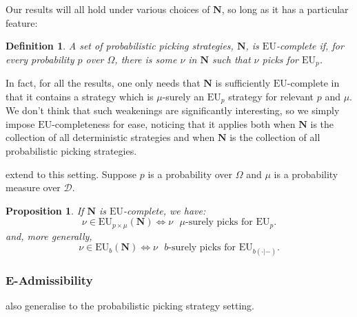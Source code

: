 \documentclass[a4paper]{article}
\newtheorem{definition}{Definition}
\newtheorem{proposition}[theorem]{Proposition}
\newcommand\D{\mathcal{D}}
\newcommand\N{\mathbf{N}}
\newcommand\EU{\mathrm{EU}}
\newcommand{\IB}{\mathbb{B}}
\newcommand{\pb}{b}
\newenvironment{CCM rewritten}
{\begingroup\color{blue}} %
{\endgroup}              %
\begin{document}
Our results will all hold under various choices of $\N$, so long as it has a particular feature: 
\begin{definition}\label{def:EU-complete}
	A set of probabilistic picking strategies, $\N$, is \emph{$\EU$-complete} if, for every probability $p$ over $\Omega$, there is some $\nu$ in $\N$ such that $\nu$ picks for $\EU_p$.
\end{definition}

In fact, for all the results, one only needs that $\N$ is sufficiently $\EU$-complete in that it contains a strategy which is $\mu$-surely an $\EU_p$ strategy for relevant $p$ and $\mu$. We don't think that such weakenings are significantly interesting, so we simply impose $\EU$-completeness for ease, noticing that it applies both when $\N$ is the collection of all deterministic strategies and when $\N$ is the collection of all probabilistic picking strategies. 

 extend to this setting.
Suppose $p$ is a probability over $\Omega$ and $\mu$ is a probability measure over $\D$.
\begin{proposition}\label{thm:eu-nu-nec-suff}
If $\N$ is $\EU$-complete, we have:
$$\nu \in \EU_{p\times \mu}(\N) \Leftrightarrow \nu \text{ $\mu$-surely picks for $\EU_p$.}$$
and, more generally, 
$$\nu \in \EU_{\pb}(\N) \Leftrightarrow \nu \text{ $\pb$-surely picks for $\EU_{\pb(\cdot|-)}$.}$$
\end{proposition}


\subsubsection{E-Admissibility}
 also generalise to the probabilistic picking strategy setting. 
\end{document}
